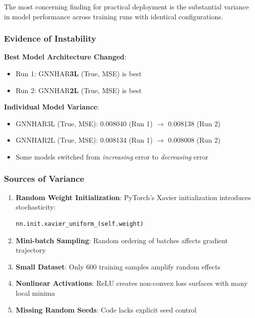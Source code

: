 \documentclass[10pt,a4paper]{article}
\begin{document}
The most concerning finding for practical deployment is the substantial variance in model performance across training runs with identical configurations.

\subsubsection{Evidence of Instability}

\textbf{Best Model Architecture Changed}:
\begin{itemize}
\item Run 1: GNNHAR\textbf{3L} (True, MSE) is best
\item Run 2: GNNHAR\textbf{2L} (True, MSE) is best
\end{itemize}

\textbf{Individual Model Variance}:
\begin{itemize}
\item GNNHAR3L (True, MSE): 0.008040 (Run 1) $\to$ 0.008138 (Run 2)
\item GNNHAR2L (True, MSE): 0.008134 (Run 1) $\to$ 0.008008 (Run 2)
\item Some models switched from \textit{increasing} error to \textit{decreasing} error
\end{itemize}

\subsubsection{Sources of Variance}

\begin{enumerate}
\item \textbf{Random Weight Initialization}: PyTorch's Xavier initialization introduces stochasticity:
\begin{verbatim}
nn.init.xavier_uniform_(self.weight)
\end{verbatim}

\item \textbf{Mini-batch Sampling}: Random ordering of batches affects gradient trajectory

\item \textbf{Small Dataset}: Only 600 training samples amplify random effects

\item \textbf{Nonlinear Activations}: ReLU creates non-convex loss surfaces with many local minima

\item \textbf{Missing Random Seeds}: Code lacks explicit seed control
\end{enumerate}
\end{document}
